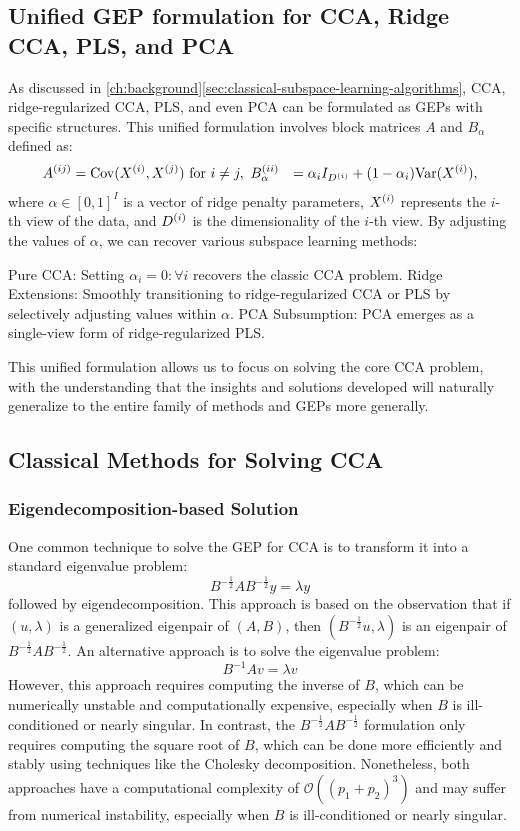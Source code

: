 \subsection{Unified GEP formulation for CCA, Ridge CCA, PLS, and PCA}
As discussed in \ref{ch:background}\ref{sec:classical-subspace-learning-algorithms}, CCA, ridge-regularized CCA, PLS, and even PCA can be formulated as GEPs with specific structures. This unified formulation involves block matrices $A$ and $B_\alpha$ defined as:
\begin{align}
A^{(ij)} &= \mathrm{Cov}(X^{(i)}, X^{(j)}) \text{ for } i \neq j, \
B_\alpha^{(ii)} &= \alpha_i I_{D^{(i)}} + (1-\alpha_i) \mathrm{Var}(X^{(i)}),
\end{align}
where $\alpha \in [0,1]^I$ is a vector of ridge penalty parameters, $X^{(i)}$ represents the $i$-th view of the data, and $D^{(i)}$ is the dimensionality of the $i$-th view.
By adjusting the values of $\alpha$, we can recover various subspace learning methods:

Pure CCA: Setting $\alpha_i = 0 : \forall i$ recovers the classic CCA problem.
Ridge Extensions: Smoothly transitioning to ridge-regularized CCA or PLS by selectively adjusting values within $\alpha$.
PCA Subsumption: PCA emerges as a single-view form of ridge-regularized PLS.

This unified formulation allows us to focus on solving the core CCA problem, with the understanding that the insights and solutions developed will naturally generalize to the entire family of methods and GEPs more generally.

\subsection{Classical Methods for Solving CCA}
\subsubsection{Eigendecomposition-based Solution}
One common technique to solve the GEP for CCA is to transform it into a standard eigenvalue problem:
\begin{equation}
B^{-\frac{1}{2}} A B^{-\frac{1}{2}} y = \lambda y
\end{equation}
followed by eigendecomposition. This approach is based on the observation that if $(u, \lambda)$ is a generalized eigenpair of $(A, B)$, then $(B^{-\frac{1}{2}}u, \lambda)$ is an eigenpair of $B^{-\frac{1}{2}} A B^{-\frac{1}{2}}$.
An alternative approach is to solve the eigenvalue problem:
\begin{equation}
B^{-1} A v = \lambda v
\end{equation}
However, this approach requires computing the inverse of $B$, which can be numerically unstable and computationally expensive, especially when $B$ is ill-conditioned or nearly singular. In contrast, the $B^{-\frac{1}{2}} A B^{-\frac{1}{2}}$ formulation only requires computing the square root of $B$, which can be done more efficiently and stably using techniques like the Cholesky decomposition.
Nonetheless, both approaches have a computational complexity of $\mathcal{O}((p_1+p_2)^3)$ and may suffer from numerical instability, especially when $B$ is ill-conditioned or nearly singular.

